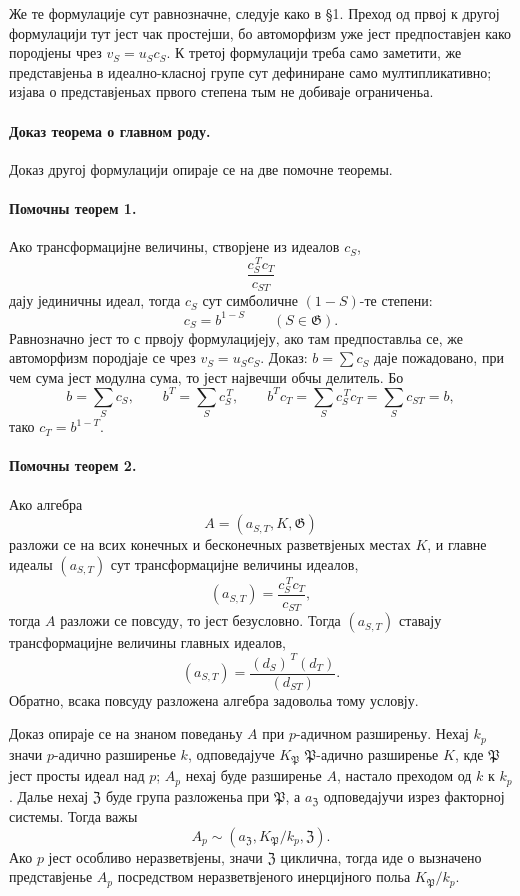 ﻿\documentclass[11pt]{article}
\providecommand{\Gg}{\mathfrak G}
\providecommand{\PP}{\mathfrak P}
\begin{document}
Же те формулације сут равнозначне, следује како в §1. Преход од првој к другој формулацији тут јест чак простејши, бо автоморфизм уже јест предпоставјен како породјены чрез \(v_S=u_Sc_S\). К третој формулацији треба само заметити, же представјеньа в идеално-класној групе сут дефиниране само мултипликативно; изјава о представјеньах првого степена тым не добиваје ограниченьа.

\paragraph{Доказ теорема о главном роду.}
Доказ другој формулацији опираје се на две помочне теоремы.

\paragraph{Помочны теорем 1.}
Ако трансформацијне величины, створјене из идеалов \(c_S\),
\[
        \frac{c_S^{\,T}c_T}{c_{ST}}
\]
дају јединичны идеал, тогда \(c_S\) сут симболичне \((1-S)\)-те степени:
\[
        c_S=b^{1-S}\qquad(S\in\Gg).
\]
Равнозначно јест то с првоју формулацијеју, ако там предпоставльа се, же автоморфизм породјаје се чрез \(v_S=u_Sc_S\). Доказ: \(b=\sum c_S\) даје пожадовано, при чем сума јест модулна сума, то јест највечши обчы делитель. Бо
\[
        b=\sum_S c_S,\qquad
        b^T=\sum_S c_S^{\,T},\qquad
        b^T c_T=\sum_S c_S^{\,T}c_T=\sum_S c_{ST}=b,
\]
тако \(c_T=b^{1-T}\).

\paragraph{Помочны теорем 2.}
Ако алгебра
\[
        A=(a_{S,T},K,\Gg)
\]
разложи се на всих конечных и бесконечных разветвјеных местах \(K\), и главне идеалы \((a_{S,T})\) сут трансформацијне величины идеалов,
\[
        (a_{S,T})=\frac{c_S^{\,T}c_T}{c_{ST}},
\]
тогда \(A\) разложи се повсуду, то јест безусловно. Тогда \((a_{S,T})\) ставају трансформацијне величины главных идеалов,
\[
        (a_{S,T})=\frac{(d_S)^{\,T}(d_T)}{(d_{ST})}.
\]
Обратно, всака повсуду разложена алгебра задовольа тому условју.

Доказ опираје се на знаном поведаньу \(A\) при \(p\)-адичном разширеньу. Нехај \(k_p\) значи \(p\)-адично разширенье \(k\), одповедајуче \(K_\PP\) \(\PP\)-адично разширенье \(K\), кде \(\PP\) јест просты идеал над \(p\); \(A_p\) нехај буде разширенье \(A\), настало преходом од \(k\) к \(k_p\). Далье нехај \(\mathfrak Z\) буде група разложеньа при \(\PP\), а \(a_{\mathfrak Z}\) одповедајучи изрез факторној системы. Тогда важы
\[
        A_p\sim (a_{\mathfrak Z},K_\PP/k_p,\mathfrak Z).
\]
Ако \(p\) јест особливо неразветвјены, значи \(\mathfrak Z\) циклична, тогда иде о вызначено представјенье \(A_p\) посредством неразветвјеного инерцијного польа \(K_\PP/k_p\).
\end{document}
